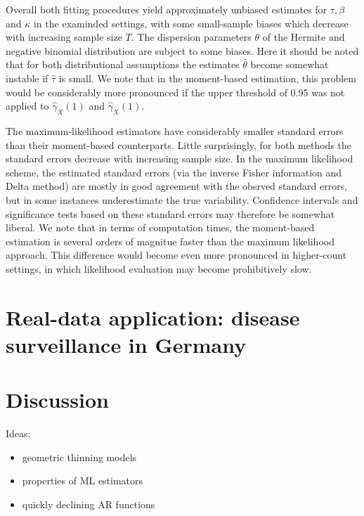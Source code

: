 \documentclass{article}
\begin{document}
\newpage

\noindent Overall both fitting procedures yield approximately unbiased estimates for $\tau, \beta$ and $\kappa$ in the examinded settings, with some small-sample biases which decrease with increasing sample size $T$. The dispersion parameters $\theta$ of the Hermite and negative binomial distribution are subject to some biases. Here it should be noted that for both distributional assumptions the estimates $\hat{\theta}$ become somewhat instable if $\hat{\tau}$ is small. We note that in the moment-based estimation, this problem would be considerably more pronounced if the upper threshold of 0.95 was not applied to $\hat{\gamma}_X(1)$ and $\hat{\gamma}_X(1)$.

The maximum-likelihood estimators have considerably smaller standard errors than their moment-based counterparts. Little surprisingly, for both methods the standard errors decrease with increasing sample size. In the maximum likelihood scheme, the estimated standard errors (via the inverse Fisher information and Delta method) are mostly in good agreement with the obsrved standard errors, but in some instances underestimate the true variability. Confidence intervals and significance tests based on these standard errors may therefore be somewhat liberal. We note that in terms of computation times, the moment-based estimation is several orders of magnitue faster than the maximum likelihood approach. This difference would become even more pronounced in higher-count settings, in which likelihood evaluation may become prohibitively slow. %


\section{Real-data application: disease surveillance in Germany}
\label{sec:real_data}

\section{Discussion}
\label{sec:discussion}

Ideas:
\begin{itemize}
\item geometric thinning models
\item properties of ML estimators
\item quickly declining AR functions
\end{itemize}
\end{document}
